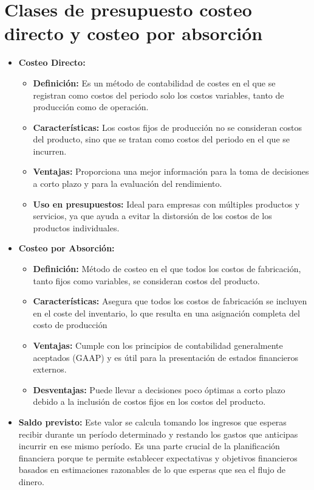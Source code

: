 \documentclass[letter,12pt]{article}
\begin{document}
		\section{Clases de presupuesto costeo directo y costeo por absorción }
		\begin{itemize}
			\item \textbf{Costeo Directo:}
				\begin{itemize}
					\item \textbf{Definición:} Es un método de contabilidad de costes en el que se registran como costos del periodo solo los costos variables, tanto de producción como de operación. 
					\item \textbf{Características:} Los costos fijos de producción no se consideran costos del producto, sino que se tratan como costos del periodo en el que se incurren.
					\item \textbf{Ventajas:} Proporciona una mejor información para la toma de decisiones a corto plazo y para la evaluación del rendimiento.
					\item \textbf{Uso en presupuestos:} Ideal para empresas con múltiples productos y servicios, ya que ayuda a evitar la distorsión de los costos de los productos individuales.
				\end{itemize}
			\item \textbf{Costeo por Absorción:}
				\begin{itemize}
					\item \textbf{Definición:} Método de costeo en el que todos los costos de fabricación, tanto fijos como variables, se consideran costos del producto.
					\item \textbf{Características:} Asegura que todos los costos de fabricación se incluyen en el coste del inventario, lo que resulta en una asignación completa del costo de producción
					\item \textbf{Ventajas:} Cumple con los principios de contabilidad generalmente aceptados (GAAP) y es útil para la presentación de estados financieros externos.
					\item \textbf{Desventajas:} Puede llevar a decisiones poco óptimas a corto plazo debido a la inclusión de costos fijos en los costos del producto.
				\end{itemize}
			\item \textbf{Saldo previsto: } Este valor se calcula tomando los ingresos que esperas recibir durante un período determinado y restando los gastos que anticipas incurrir en ese mismo período. Es una parte crucial de la planificación financiera porque te permite establecer expectativas y objetivos financieros basados en estimaciones razonables de lo que esperas que sea el flujo de dinero.

\end{itemize}
\end{document}
